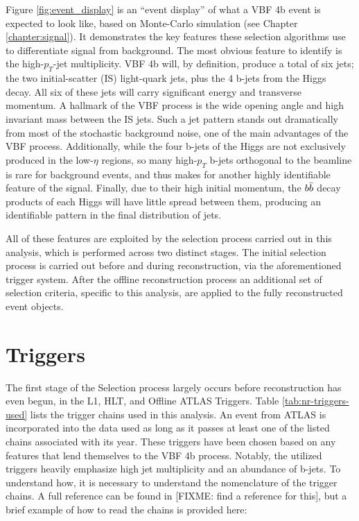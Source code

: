     Figure \ref{fig:event_display} is an ``event display'' of what a VBF \to 4b event is expected to look like,
        based on Monte-Carlo simulation (see Chapter \ref{chapter:signal}).
    It demonstrates the key features these selection algorithms use to differentiate signal from background.
    The most obvious feature to identify is the high-$p_T$-jet multiplicity.
    VBF \to 4b will, by definition, produce a total of six jets;
        the two initial-scatter (IS) light-quark jets, plus the 4 b-jets from the Higgs decay.
    All six of these jets will carry significant energy and transverse momentum.
    A hallmark of the VBF process is the wide opening angle and high invariant mass between the IS jets.
    Such a jet pattern stands out dramatically from most of the stochastic background noise,
        one of the main advantages of the VBF process.
    Additionally, while the four b-jets of the Higgs are not exclusively produced in the low-$\eta$ regions,
        so many high-$p_T$ b-jets orthogonal to the beamline is rare for background events,
        and thus makes for another highly identifiable feature of the signal.
    Finally, due to their high initial momentum,
        the $b \bar{b}$ decay products of each Higgs will have little spread between them,
        producing an identifiable pattern in the final distribution of jets.

    All of these features are exploited by the selection process carried out in this analysis,
        which is performed across two distinct stages.
    The initial selection process is carried out before and during reconstruction, via the aforementioned trigger system.
    After the offline reconstruction process an additional set of selection criteria,
        specific to this analysis, are applied to the fully reconstructed event objects.
    
    \section{Triggers}
        
        The first stage of the Selection process largely occurs before reconstruction has even begun,
            in the L1, HLT, and Offline ATLAS Triggers.
        Table \ref{tab:nr-triggers-used} lists the trigger chains used in this analysis.
        An event from ATLAS is incorporated into the data used as long as it passes at least one 
            of the listed chains associated with its year.
        These triggers have been chosen based on any features that lend themselves to the VBF \to 4b process.
        Notably, the utilized triggers heavily emphasize high jet multiplicity and an abundance of b-jets.
        To understand how, it is necessary to understand the nomenclature of the trigger chains.
        A full reference can be found in [FIXME: find a reference for this],
            but a brief example of how to read the chains is provided here:

